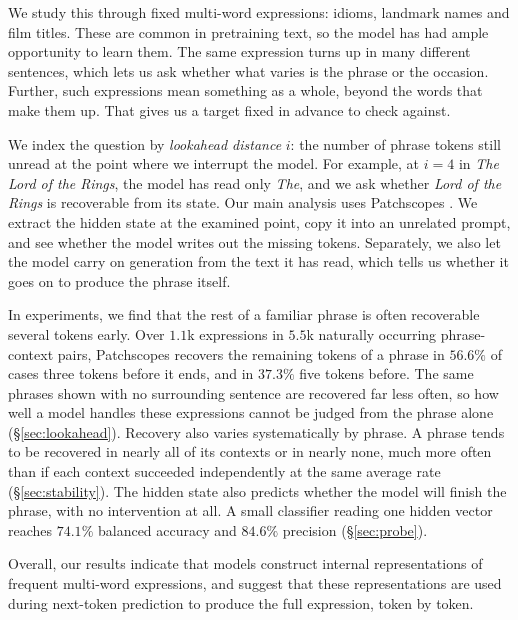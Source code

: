 We study this through fixed multi-word expressions: idioms, landmark names and
film titles. These are common
in pretraining text, so the model has had ample opportunity to learn them. The
same expression turns up in many different sentences, which lets us ask whether
what varies is the phrase or the occasion. Further, such expressions mean something as a whole,
beyond the words that make them up.
That gives us a target fixed in
advance to check against.

We index the question by \emph{lookahead distance} $i$: the number of phrase
tokens still unread at the point where we interrupt the model. For example, at $i=4$ in
\textit{The Lord of the Rings}, the model has read only \textit{The}, and we
ask whether \textit{Lord of the Rings} is recoverable from its state. Our main
analysis uses Patchscopes \citep{ghandeharioun-etal-2024-patchscopes}. We extract
the hidden state at the examined point, copy it into an unrelated prompt, and see
whether the model writes out the missing tokens. Separately, we also let the model
carry on generation from the text it has read, which tells us whether it goes on to
produce the phrase itself.

In experiments, we find that the rest of a familiar phrase is often recoverable several tokens early. Over
$1.1$k expressions in $5.5$k naturally occurring phrase-context pairs,
Patchscopes recovers the remaining tokens of a phrase in $56.6\%$ of cases
three tokens before it ends, and in $37.3\%$ five tokens before. The same
phrases shown with no surrounding sentence are recovered far less often, so how
well a model handles these expressions cannot be judged from the phrase alone
(\S\ref{sec:lookahead}). Recovery also varies systematically by phrase. A
phrase tends to be recovered in nearly all of its contexts or in nearly none,
much more often than if each context succeeded independently at the same
average rate (\S\ref{sec:stability}). The hidden state also predicts whether
the model will finish the phrase, with no intervention at all. A small
classifier reading one hidden vector reaches $74.1\%$ balanced accuracy and
$84.6\%$ precision (\S\ref{sec:probe}).

Overall, our results indicate that models construct internal representations of frequent multi-word expressions, and suggest that these representations are used during next-token prediction to produce the full expression, token by token.